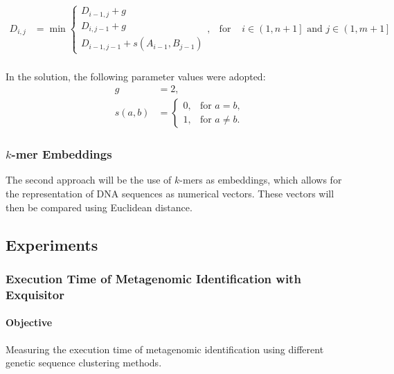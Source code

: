 \documentclass[pdflatex,sn-vancouver-num]{sn-jnl}%
\begin{document}
                \begin{equation}
                    \begin{aligned}
                        D_{i,j} &= \min
                        \begin{cases}
                        D_{i - 1, j} + g \\
                        D_{i, j - 1} + g \\
                        D_{i - 1, j - 1} + s(A_{i - 1}, B_{j - 1})
                        \end{cases}, & \text{for } & i \in \left(1, n + 1\right] \text{ and } j \in \left(1, m + 1\right] \\
                    \end{aligned}
                    \label{Equation:NeedlemanWunschModified}
                \end{equation}

                In the solution, the following parameter values were adopted:
                \begin{align*}
                    g &= 2, \\
                    s(a, b) &= \begin{cases}
                        0, & \text{for } a = b, \\
                        1, & \text{for } a \neq b.
                    \end{cases}
                \end{align*}

            \subsubsection{$k$-mer Embeddings}
                The second approach will be the use of $k$-mers as embeddings, which allows for the representation of DNA sequences as numerical vectors. These vectors will then be compared using Euclidean distance.

        \subsection{Experiments}
            \subsubsection{Execution Time of Metagenomic Identification with Exquisitor}
                \paragraph{Objective}
                Measuring the execution time of metagenomic identification using different genetic sequence clustering methods.
\end{document}
